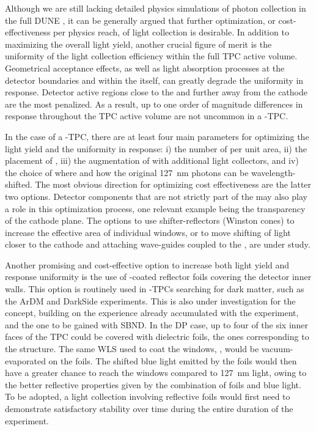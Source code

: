 Although we are still lacking detailed physics simulations of photon collection in the full DUNE , it can be generally argued that further optimization, or cost-effectiveness per physics reach, of light collection is desirable. In addition to  maximizing the overall light yield, another crucial figure of merit is the uniformity of the light collection efficiency within the full TPC active volume. Geometrical acceptance effects, as well as light absorption processes at the detector boundaries and within the \lar itself, can greatly degrade the uniformity in response. Detector active regions close to the  and further away from the cathode are the most penalized. As a result, up to one order of magnitude differences in response throughout the TPC active volume are not uncommon in a \lar-TPC.

In the case of a \lar-TPC, there are at least four main parameters for optimizing the light yield and the uniformity in response: i) the number of  per unit area, ii) the placement of , iii) the augmentation of  with additional light collectors, and iv) the choice of where and how the original \SI{127}{nm} photons can be wavelength-shifted. The most obvious direction for optimizing cost effectiveness are the latter two options. Detector components that are not strictly part of the  may also play a role in this optimization process, one relevant example being the transparency of the cathode plane. The options to use shifter-reflectors (Winston cones) to increase the effective area of individual  windows, or to move shifting of light closer to the cathode and attaching wave-guides coupled to the , are under study.

Another promising and cost-effective option to increase both light yield and response uniformity is the use of -coated reflector foils covering the detector inner walls. This option is routinely used in \dual \lar-TPCs searching for dark matter, such as the ArDM and DarkSide experiments. This is also under investigation for the  concept, building on the experience already accumulated with the \lariat experiment, and the one to be gained with SBND. In the DP case, up to four of the six inner faces of the TPC could be covered with dielectric foils, the ones corresponding to the  structure. The same WLS used to coat the  windows, , would be vacuum-evaporated on the foils. The shifted blue light emitted by the foils would then have a greater chance to reach the  windows compared to \SI{127}{nm} light, owing to the better reflective properties given by the combination of foils and blue light. To be adopted, a light collection involving reflective foils would first need to demonstrate satisfactory stability over time during the entire duration of the experiment.

